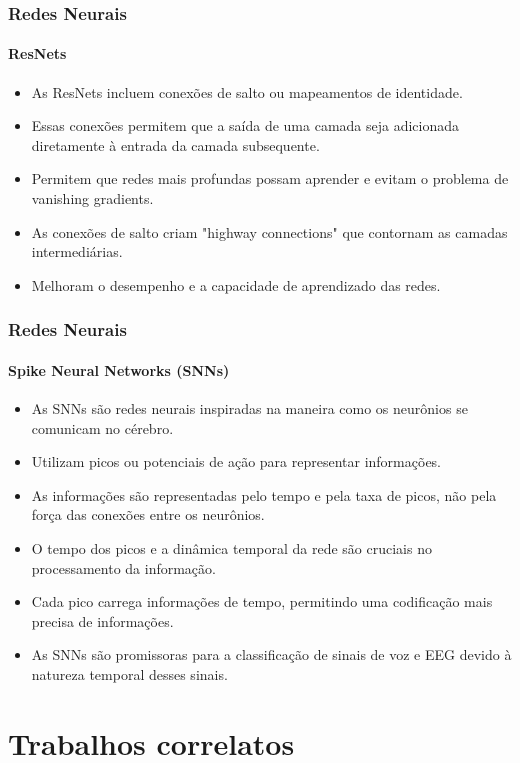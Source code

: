 \documentclass{beamer}
\begin{document}
	\begin{frame}
		\frametitle{Redes Neurais}
		\framesubtitle{ResNets}
		\begin{itemize}
			\item As ResNets incluem conexões de salto ou mapeamentos de identidade.
			\item Essas conexões permitem que a saída de uma camada seja adicionada diretamente à entrada da camada subsequente.
			\item Permitem que redes mais profundas possam aprender e evitam o problema de vanishing gradients.
			\item As conexões de salto criam "highway connections" que contornam as camadas intermediárias.
			\item Melhoram o desempenho e a capacidade de aprendizado das redes.
		\end{itemize}
	\end{frame}
	
	\begin{frame}
		\frametitle{Redes Neurais}
		\framesubtitle{Spike Neural Networks (SNNs)}
		\begin{itemize}
			\item As SNNs são redes neurais inspiradas na maneira como os neurônios se comunicam no cérebro.
			\item Utilizam picos ou potenciais de ação para representar informações.
			\item As informações são representadas pelo tempo e pela taxa de picos, não pela força das conexões entre os neurônios.
			\item O tempo dos picos e a dinâmica temporal da rede são cruciais no processamento da informação.
			\item Cada pico carrega informações de tempo, permitindo uma codificação mais precisa de informações.
			\item As SNNs são promissoras para a classificação de sinais de voz e EEG devido à natureza temporal desses sinais.
		\end{itemize}
	\end{frame}

	\section{Trabalhos correlatos}
	
\end{document}
